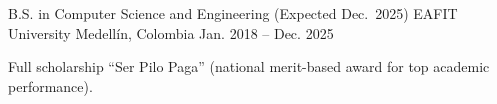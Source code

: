 
\begin{cventries}
  \cventry
    {B.S. in Computer Science and Engineering (Expected Dec.\ 2025)}
    {EAFIT University}
    {Medellín, Colombia}
    {Jan. 2018 -- Dec. 2025}
    {
      \begin{cvitems}
        \item {Full scholarship ``Ser Pilo Paga'' (national merit-based award for top academic performance).}
      \end{cvitems}
    }
\end{cventries}
